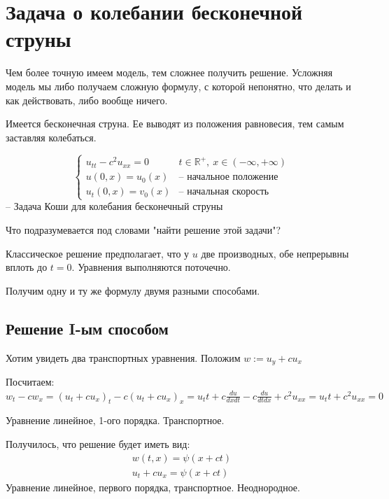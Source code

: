 \documentclass[12pt]{report}
\begin{document}
\section{Задача о колебании бесконечной струны}

Чем более точную имеем модель, тем сложнее получить решение. Усложняя модель мы либо получаем сложную формулу, с которой непонятно, что делать и как действовать, либо вообще ничего. 

Имеется бесконечная струна. Ее выводят из положения равновесия, тем самым заставляя колебаться. 

\begin{equation} \label{pro:CauchyWave}
    \begin{cases}
        u_{tt} - c ^ 2 u_{xx} = 0 & t \in \mathbb{R} ^ +, \: x \in (-\infty, +\infty)
        \\
        u(0,x) = u_0(x) & \text{-- начальное положение}
        \\
        u_t(0, x) = v_0(x) & \text{-- начальная скорость}
    \end{cases}
\end{equation}
-- Задача Коши для колебания бесконечный струны

Что подразумевается под словами "найти решение этой задачи"?

Классическое решение предполагает, что у $u$ две производных, обе непрерывны вплоть до $t = 0$. Уравнения выполняются поточечно. 

Получим одну и ту же формулу двумя разными способами. 

\subsection{Решение I-ым способом}

Хотим увидеть два транспортных уравнения. Положим $w := u_y + cu_x$

Посчитаем: $w_t - c w_x = (u_t + c u_x)_t - c(u_t + c u_x)_x = u_tt + c \frac{du}{dxdt} - c \frac{du}{dtdx} + c ^ 2 u_{xx} = u_tt + c ^ 2 u_{xx} = 0$

Уравнение линейное, 1-ого порядка. Транспортное. 

Получилось, что решение будет иметь вид: 
\[
    \begin{gathered}
        w(t,x) = \psi(x + ct)
        \\
        u_t + c u_x = \psi(x + ct)
    \end{gathered}
\]
Уравнение линейное, первого порядка, транспортное. Неоднородное. 
 
\end{document}
